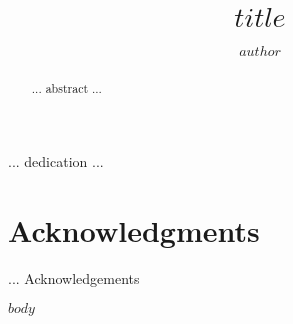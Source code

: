 \documentclass[edeposit,fullpage]{uiucthesis2014}
\begin{document}
\title{$title$}
\author{$author$}
\msthesis
{}
\maketitle

\frontmatter

\begin{abstract}
... abstract ...
\end{abstract}

\begin{dedication}
... dedication ...
\end{dedication}

\chapter*{Acknowledgments}

... Acknowledgements


\tableofcontents
\listoftables
\listoffigures

\mainmatter

$body$

\appendix*



\backmatter



\end{document}
